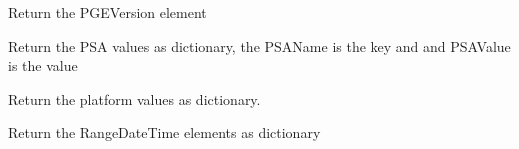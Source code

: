 \documentclass[a4paper,11pt,oneside]{sphinxmanual}
\begin{document}
\begin{fulllineitems}
\begin{fulllineitems}
\label{pymodis/pymodis:pymodis.parsemodis.parseModis.retPGEVersion}
Return the PGEVersion element

\end{fulllineitems}


\begin{fulllineitems}
\label{pymodis/pymodis:pymodis.parsemodis.parseModis.retPSA}
Return the PSA values as dictionary, the PSAName is the key and
and PSAValue is the value

\end{fulllineitems}


\begin{fulllineitems}
\label{pymodis/pymodis:pymodis.parsemodis.parseModis.retPlatform}
Return the platform values as dictionary.

\end{fulllineitems}


\begin{fulllineitems}
\label{pymodis/pymodis:pymodis.parsemodis.parseModis.retRangeTime}
Return the RangeDateTime elements as dictionary

\end{fulllineitems}


\end{fulllineitems}

\end{document}
